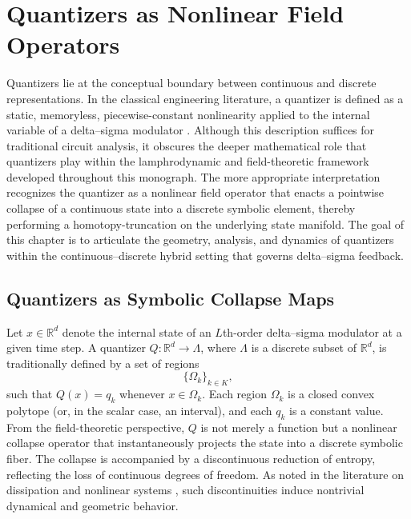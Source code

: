 
\chapter{Quantizers as Nonlinear Field Operators}

Quantizers lie at the conceptual boundary between continuous and discrete representations. In the classical engineering literature, a quantizer is defined as a static, memoryless, piecewise-constant nonlinearity applied to the internal variable of a delta--sigma modulator \parencite{SchreierTemes2005}. Although this description suffices for traditional circuit analysis, it obscures the deeper mathematical role that quantizers play within the lamphrodynamic and field-theoretic framework developed throughout this monograph. The more appropriate interpretation recognizes the quantizer as a nonlinear field operator that enacts a pointwise collapse of a continuous state into a discrete symbolic element, thereby performing a homotopy-truncation on the underlying state manifold. The goal of this chapter is to articulate the geometry, analysis, and dynamics of quantizers within the continuous--discrete hybrid setting that governs delta--sigma feedback.

\section{Quantizers as Symbolic Collapse Maps}

Let $x \in \mathbb{R}^{d}$ denote the internal state of an $L$th-order delta--sigma modulator at a given time step. A quantizer $Q: \mathbb{R}^{d} \to \Lambda$, where $\Lambda$ is a discrete subset of $\mathbb{R}^{d}$, is traditionally defined by a set of regions
\[
\{ \Omega_k \}_{k \in K},
\]
such that $Q(x) = q_k$ whenever $x \in \Omega_k$. Each region $\Omega_k$ is a closed convex polytope (or, in the scalar case, an interval), and each $q_k$ is a constant value. From the field-theoretic perspective, $Q$ is not merely a function but a nonlinear collapse operator that instantaneously projects the state into a discrete symbolic fiber. The collapse is accompanied by a discontinuous reduction of entropy, reflecting the loss of continuous degrees of freedom. As noted in the literature on dissipation and nonlinear systems \parencite{Willems1972Dissipative,GuckenheimerHolmes1983}, such discontinuities induce nontrivial dynamical and geometric behavior.

